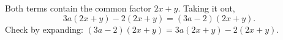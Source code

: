 Both terms contain the common factor $2x+y$. Taking it out,
\[
3a(2x+y)-2(2x+y)=\boxed{(3a-2)(2x+y)} .
\]
Check by expanding: $(3a-2)(2x+y)=3a(2x+y)-2(2x+y)$.
